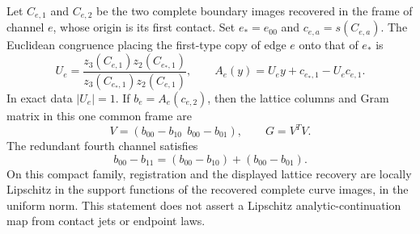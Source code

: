 \begin{proposition}
\label{prop:v44-harmonic-registration}
Let $C_{e,1}$ and $C_{e,2}$ be the two complete boundary images recovered
in the frame of channel $e$, whose origin is its first contact.  Set
$e_*=e_{00}$ and $c_{e,a}=s(C_{e,a})$.  The Euclidean congruence placing
the first-type copy of edge $e$ onto that of $e_*$ is
\begin{equation}\label{eq:v44-fourier-registration}
 U_e=\frac{z_3(C_{e,1})z_2(C_{e_*,1})}
           {z_3(C_{e_*,1})z_2(C_{e,1})},\qquad
 A_e(y)=U_e y+c_{e_*,1}-U_e c_{e,1}.
\end{equation}
In exact data $|U_e|=1$.  If $b_e=A_e(c_{e,2})$, then the lattice
columns and Gram matrix in this one common frame are
\begin{equation}\label{eq:v44-explicit-recovery}
 V=(b_{00}-b_{10}\ \ b_{00}-b_{01}),\qquad G=V^TV.
\end{equation}
The redundant fourth channel satisfies
\begin{equation}\label{eq:v44-redundant-cycle}
 b_{00}-b_{11}=(b_{00}-b_{10})+(b_{00}-b_{01}).
\end{equation}
On this compact family, registration and the displayed lattice recovery
are locally Lipschitz in the support functions of the recovered complete
curve images, in the uniform norm.  This statement does not assert a
Lipschitz analytic-continuation map from contact jets or endpoint laws.
\end{proposition}

